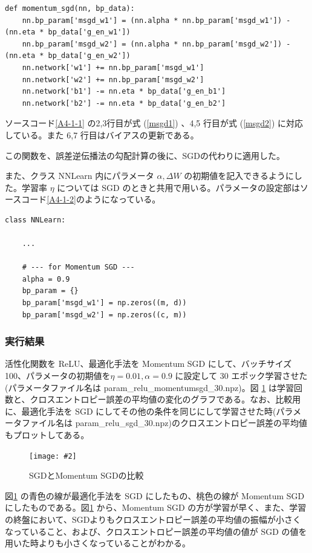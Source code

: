 \documentclass[a4paper,dvipdfmx]{jsarticle}
\newcommand{\image}[3]{
    \begin{figure}[H]
        \begin{center}
        \texttt{[image: \#2]}
        \end{center}
        \caption{#1}
        \label{#3}
    \end{figure}
}
\begin{document}
\begin{lstlisting}[caption="Momentum SGD",label=A4-1-1]
def momentum_sgd(nn, bp_data):
    nn.bp_param['msgd_w1'] = (nn.alpha * nn.bp_param['msgd_w1']) - (nn.eta * bp_data['g_en_w1'])
    nn.bp_param['msgd_w2'] = (nn.alpha * nn.bp_param['msgd_w2']) - (nn.eta * bp_data['g_en_w2'])
    nn.network['w1'] += nn.bp_param['msgd_w1']
    nn.network['w2'] += nn.bp_param['msgd_w2']
    nn.network['b1'] -= nn.eta * bp_data['g_en_b1']
    nn.network['b2'] -= nn.eta * bp_data['g_en_b2']
\end{lstlisting}

ソースコード\ref{A4-1-1} の2,3行目が式 (\ref{msgd1}) 、4,5 行目が式 (\ref{msgd2}) に対応している。また 6,7 行目はバイアスの更新である。

この関数を、誤差逆伝播法の勾配計算の後に、SGDの代わりに適用した。

また、クラス NNLearn 内にパラメータ $\alpha, \Delta W$ の初期値を記入できるようにした。学習率 $\eta$ については SGD のときと共用で用いる。パラメータの設定部はソースコード\ref{A4-1-2}のようになっている。
\begin{lstlisting}[caption="Momentum SGDのパラメータ設定部",label=A4-1-2]
class NNLearn:

	...
	
    # --- for Momentum SGD ---
    alpha = 0.9
    bp_param = {}
    bp_param['msgd_w1'] = np.zeros((m, d))
    bp_param['msgd_w2'] = np.zeros((c, m))
\end{lstlisting}
\subsubsection*{実行結果}

活性化関数を ReLU、最適化手法を Momentum SGD にして、バッチサイズ 100、パラメータの初期値を$\eta = 0.01, \alpha = 0.9$ に設定して 30 エポック学習させた(パラメータファイル名は param\_relu\_momentumsgd\_30.npz)。図 \ref{fig-A4-1-1} は学習回数と、クロスエントロピー誤差の平均値の変化のグラフである。なお、比較用に、最適化手法を SGD にしてその他の条件を同じにして学習させた時(パラメータファイル名は param\_relu\_sgd\_30.npz)のクロスエントロピー誤差の平均値もプロットしてある。

\image{SGDとMomentum SGDの比較}{report_a4-1.png}{fig-A4-1-1}

図\ref{fig-A4-1-1} の青色の線が最適化手法を SGD にしたもの、桃色の線が Momentum SGD にしたものである。図\ref{fig-A4-1-1} から、Momentum SGD の方が学習が早く、また、学習の終盤において、SGDよりもクロスエントロピー誤差の平均値の振幅が小さくなっていること、および、クロスエントロピー誤差の平均値の値が SGD の値を用いた時よりも小さくなっていることがわかる。
\end{document}
